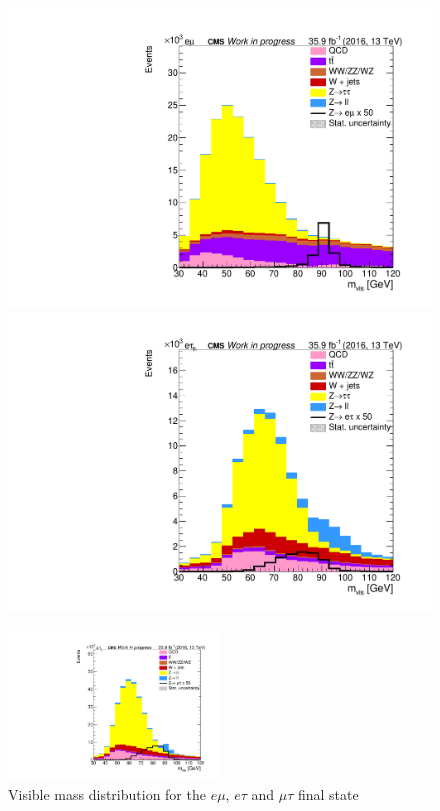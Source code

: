 \begin{figure}[htp]
	\centering
		
	\begin{multicols}{2}
		\includegraphics[width=\linewidth]{plots/em/VisibleMass.pdf}
		\includegraphics[width=\linewidth]{plots/et/VisibleMass.pdf}
	\end{multicols}

	\includegraphics[width=0.5\textwidth]{plots/mt/VisibleMass.pdf}

	\caption[Visible mass distribution]{Visible mass distribution for the $e\mu$, $e\tau$ and $\mu\tau$ final state}
	\label{fig:m_vis}
\end{figure}


